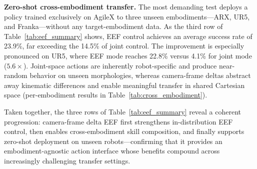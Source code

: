 \textbf{Zero-shot cross-embodiment transfer.} The most demanding test deploys a policy trained exclusively on AgileX to three unseen embodiments---ARX, UR5, and Franka---without any target-embodiment data. As the third row of Table~\ref{tab:eef_summary} shows, EEF control achieves an average success rate of 23.9\%, far exceeding the 14.5\% of joint control. The improvement is especially pronounced on UR5, where EEF mode reaches 22.8\% versus 4.1\% for joint mode ($5.6\times$). Joint-space actions are inherently robot-specific and produce near-random behavior on unseen morphologies, whereas camera-frame deltas abstract away kinematic differences and enable meaningful transfer in shared Cartesian space (per-embodiment results in Table~\ref{tab:cross_embodiment}).

Taken together, the three rows of Table~\ref{tab:eef_summary} reveal a coherent progression: camera-frame delta EEF first strengthens in-distribution EEF control, then enables cross-embodiment skill composition, and finally supports zero-shot deployment on unseen robots---confirming that it provides an embodiment-agnostic action interface whose benefits compound across increasingly challenging transfer settings.

